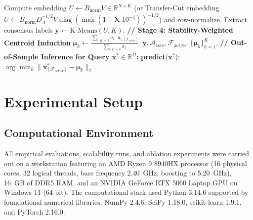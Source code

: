 \documentclass[pdflatex,sn-mathphys-num]{sn-jnl}
\theoremstyle{thmstyleone}
\theoremstyle{thmstyletwo}
\theoremstyle{thmstylethree}
\begin{document}
\begin{algorithm}[!t]
\begin{algorithmic}[1]
\State Compute embedding $U \leftarrow B_{\text{norm}} V \in \mathbb{R}^{N \times K}$ (or Transfer-Cut embedding $U \leftarrow B_{\text{norm}} D_A^{-1/2} V \operatorname{diag}(\max(1-\boldsymbol{\lambda}, 10^{-4}))^{-1/2}$) and row-normalize.
\State Extract consensus labels $\mathbf{y} \leftarrow \text{K-Means}(U, K)$.
\Statex \textbf{// Stage 4: Stability-Weighted Centroid Induction}
 \State $\boldsymbol{\mu}_k \leftarrow \frac{\sum_{i: y_i = k} \sigma_i \cdot \mathbf{x}_{i, [\mathcal{F}_{\text{active}}]}}{\sum_{i: y_i = k} \sigma_i}$.
\EndFor
\State \Return $\mathbf{y}, \mathcal{A}_{\text{core}}, \mathcal{F}_{\text{active}}, \{\boldsymbol{\mu}_k\}_{k=1}^K$.
\Statex \textbf{// Out-of-Sample Inference for Query $\mathbf{x}^* \in \mathbb{R}^D$:}
\State \textbf{predict}($\mathbf{x}^*$): \Return $\arg\min_k \|\mathbf{x}^*_{[\mathcal{F}_{\text{active}}]} - \boldsymbol{\mu}_k\|_2$.
\end{algorithmic}
\end{algorithm}


\section{Experimental Setup}\label{sec:setup}

\subsection{Computational Environment}\label{sec:setup_env}
All empirical evaluations, scalability runs, and ablation experiments were carried out on a workstation featuring an AMD Ryzen 9 8940HX processor (16 physical cores, 32 logical threads, base frequency 2.40~GHz, boosting to 5.20~GHz), 16~GB of DDR5 RAM, and an NVIDIA GeForce RTX 5060 Laptop GPU on Windows 11 (64-bit). The computational stack used Python 3.14.6 supported by foundational numerical libraries: NumPy 2.4.6, SciPy 1.18.0, scikit-learn 1.9.1, and PyTorch 2.16.0.
\end{document}
